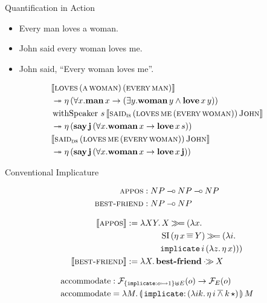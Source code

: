 \documentclass{beamer}
\begin{document}
\begin{frame}{Quantification in Action}
 
\begin{itemize}
  \item Every man loves a woman.
  \item John said every woman loves me.
  \item John said, ``Every woman loves me''.
\end{itemize}

\vfill
\pause
 
\begin{align*}
  & \llbracket \textsc{loves}\,(\textsc{a}\,\textsc{woman})\,(\textsc{every}\,\textsc{man}) \rrbracket \nonumber \\
  & \twoheadrightarrow \eta\,(\forall x. \textbf{man}\,x \to (\exists y. \textbf{woman}\,y \land \textbf{love}\,x\,y)) \\
  & \operatorname{withSpeaker}\,s\,\llbracket \textsc{said}_{\textsc{is}}\,(\textsc{loves}\,\textsc{me}\,(\textsc{every}\,\textsc{woman}))\,\textsc{John} \rrbracket \nonumber \\
  & \twoheadrightarrow \eta\,(\textbf{say}\,\textbf{j}\,(\forall x. \textbf{woman}\,x \to \textbf{love}\,x\,s)) \\
  & \llbracket \textsc{said}_{\textsc{ds}}\,(\textsc{loves}\,\textsc{me}\,(\textsc{every}\,\textsc{woman}))\,\textsc{John} \rrbracket \nonumber \\
  & \twoheadrightarrow \eta\,(\textbf{say}\,\textbf{j}\,(\forall x. \textbf{woman}\,x \to \textbf{love}\,x\,\textbf{j}))
\end{align*}

\end{frame}


\begin{frame}{Conventional Implicature}
  
\begin{align*}
  \textsc{appos} &: NP \mathbin{{-}\mkern-3.5mu{\circ}} NP \mathbin{{-}\mkern-3.5mu{\circ}} NP \\
  \textsc{best-friend} &: NP \mathbin{{-}\mkern-3.5mu{\circ}} NP
\end{align*}

\vfill
\pause

\begin{align*}
  \llbracket \textsc{appos} \rrbracket &:= \lambda X Y.\, X \mathbin{\gg\!=} (\lambda x.\, \\
      & \qquad \qquad \operatorname{SI}\,(\eta\,x \mathbin{\overline{=}} Y) \mathbin{\gg\!=} (\lambda i.\, \\
          & \qquad \qquad \mathtt{implicate}\,i\,(\lambda z.\, \eta\,x))) \\
  \llbracket \textsc{best-friend} \rrbracket &:= \lambda X.\, \textbf{best-friend} \mathbin{\cdot\!\!\gg} X
\end{align*}

\vfill
\pause

\begin{align*}
  \accommodate &: \FF_{\{\typedop{implicate}{o}{1}\} \uplus E}(o) \to \FF_E(o) \\
  \accommodate &= \lam{M}{\ap{\banana{\onto{\op{implicate}}{(\lam{i
            k}{\etaE{i} \dand \ap{k}{\star}})}}}{M}}
\end{align*}

\end{frame}
\end{document}
